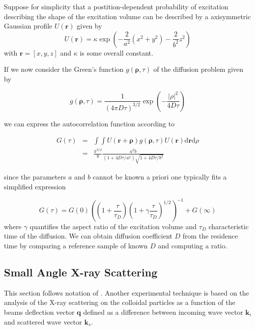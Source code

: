 \documentclass{doctoral}
\newcommand{\dd}{\mathrm{d}}
\begin{document}
Suppose for simplicity that a postition-dependent probability of excitation describing the shape of the excitation volume can be described by a axisymmetric Gaussian profile $U(\mathbf{r})$ given by
\begin{equation}
    U(\mathbf{r}) = \kappa \exp\left( - \frac{2}{a^2} \left( x^2 + y^2 \right) - \frac{2}{b^2} z^2 \right) \label{eqn:excitation_profile}
\end{equation}
with $\mathbf{r} = [x,y,z]$ and $\kappa$ is some overall constant.

If we now consider the Green's function $g(\mathbf{\rho},\tau)$ of the diffusion problem given by 

\begin{equation}
    g(\mathbf{\rho},\tau) = \frac{1}{(4\pi D \tau)^{3/2}} \exp\left( - \frac{|\rho|^2}{4 D \tau}\right)
\end{equation}

we can express the autocorrelation function according to 

\begin{eqnarray}
    G(\tau) & = & \int \int U(\mathbf{r} + \mathbf{\rho}) g(\mathbf{\rho},\tau) U(\mathbf{r}) \dd \mathbf{r} \dd \rho \\
            & = & \frac{\pi^{3/2}}{8} \frac{a^2 b}{(1+4 D \tau / a^2)\sqrt{1+4D\tau/b^2}} \label{eqn:fcs_theory}
\end{eqnarray}

since the parameters $a$ and $b$ cannot be known a priori one typically fits a simplified expression 

\begin{equation}
    G(\tau) = G(0) \left( \left(1+\frac{\tau}{\tau_D}\right) \left(1 + \gamma \frac{\tau}{\tau_D}\right)^{1/2} \right)^{-1} + G(\infty) \label{eqn:fcs-autocorrelation}
\end{equation}
where $\gamma$ quantifies the aspect ratio of the excitation volume and $\tau_D$ characteristic time of the diffusion.
We can obtain diffusion coefficient $D$ from the residence time by comparing a reference sample of known $D$ and computing a ratio.

\subsection{Small Angle X-ray Scattering}
\label{sec:SAXS}

This section follows notation of \cite{Hermann_2008}.
Another experimental technique is based on the analysis of the X-ray scattering on the colloidal particles as a function of the beams deflection vector $\mathbf{q}$ defined as a difference between incoming wave vector $\mathbf{k}_i$ and scattered wave vector $\mathbf{k}_s$.
\end{document}
